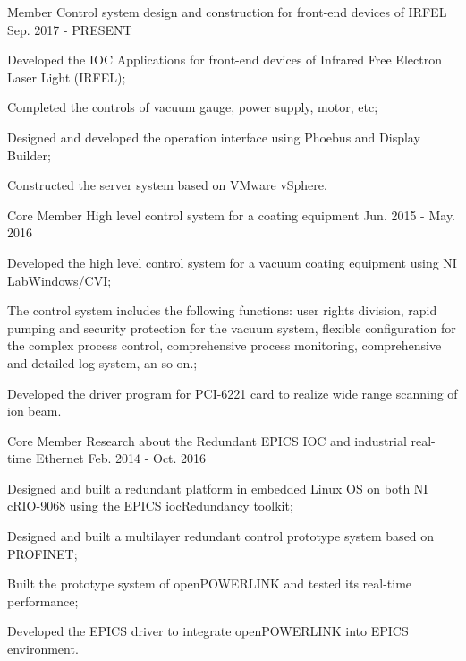 \begin{cventries}
  \cventry
    {Member} %
    {Control system design and construction for front-end devices of IRFEL} %
    {} %
    {Sep. 2017 - PRESENT} %
    {
      \begin{cvitems} %
        \item {Developed the IOC Applications for front-end devices of Infrared Free Electron Laser Light (IRFEL);}
        \item {Completed the controls of vacuum gauge, power supply, motor, etc;}
        \item {Designed and developed the operation interface using Phoebus and Display Builder;}
        \item {Constructed the server system based on VMware vSphere.}
      \end{cvitems}
    }

  \cventry
    {Core Member} %
    {High level control system for a coating equipment} %
    {} %
    {Jun. 2015 - May. 2016} %
    {
      \begin{cvitems} %
        \item {Developed the high level control system for a vacuum coating equipment using NI LabWindows/CVI;}
        \item {The control system includes the following functions: user rights division, rapid pumping and security protection for the vacuum system, flexible configuration for the complex process control, comprehensive process monitoring, comprehensive and detailed log system, an so on.;}
        \item {Developed the driver program for PCI-6221 card to realize wide range scanning of ion beam.}
      \end{cvitems}
    }

  \cventry
    {Core Member} %
    {Research about the Redundant EPICS IOC and industrial real-time Ethernet} %
    {} %
    {Feb. 2014 - Oct. 2016} %
    {
      \begin{cvitems} %
        \item {Designed and built a redundant platform in embedded Linux OS on both NI cRIO-9068 using the EPICS iocRedundancy toolkit;}
        \item {Designed and built a multilayer redundant control prototype system based on PROFINET;}
        \item {Built the prototype system of openPOWERLINK and tested its real-time performance;}
        \item {Developed the EPICS driver to integrate openPOWERLINK into EPICS environment.}
      \end{cvitems}
    }

\end{cventries}
